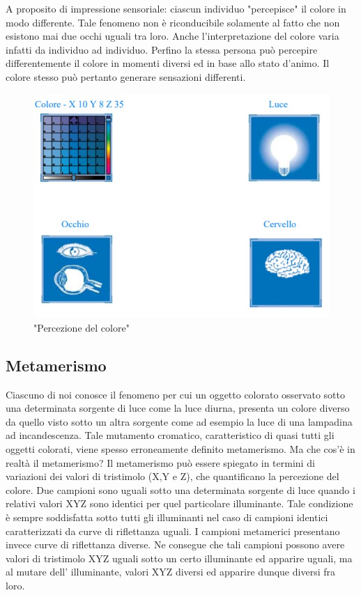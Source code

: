 \documentclass[a4paper,11pt]{article}
\begin{document}
        A proposito di impressione sensoriale: ciascun individuo "percepisce" il colore in modo
        differente. Tale fenomeno non è riconducibile solamente al fatto che non esistono mai due occhi
        uguali tra loro. Anche l’interpretazione del colore varia infatti da individuo ad individuo.
        Perfino la stessa persona può percepire differentemente il colore in momenti diversi ed in base
        allo stato d’animo. Il colore stesso può pertanto generare sensazioni differenti. 

        \begin{figure}[h]
            \centering
            \includegraphics[scale=0.8]{colorimetria1}
            \caption{"Percezione del colore"}
        \end{figure}

        \subsection{Metamerismo}
        Ciascuno di noi conosce il fenomeno per cui un oggetto colorato osservato sotto una
        determinata sorgente di luce come la luce diurna, presenta un colore diverso da quello visto
        sotto un altra sorgente come ad esempio la luce di una lampadina ad incandescenza. Tale
        mutamento cromatico, caratteristico di quasi tutti gli oggetti colorati, viene spesso erroneamente
        definito metamerismo. Ma che cos’è in realtà il metamerismo?
        Il metamerismo può essere spiegato in termini di variazioni dei valori di tristimolo (X,Y e Z),
        che quantificano la percezione del colore. Due campioni sono uguali sotto una determinata
        sorgente di luce quando i relativi valori XYZ sono identici per quel particolare illuminante. Tale
        condizione è sempre soddisfatta sotto tutti gli illuminanti nel caso di campioni identici
        caratterizzati da curve di riflettanza uguali. I campioni metamerici presentano invece curve di
        riflettanza diverse. Ne consegue che tali campioni possono avere valori di tristimolo XYZ
        uguali sotto un certo illuminante ed apparire uguali, ma al mutare dell' illuminante, valori XYZ
        diversi ed apparire dunque diversi fra loro. 
        
\end{document}
